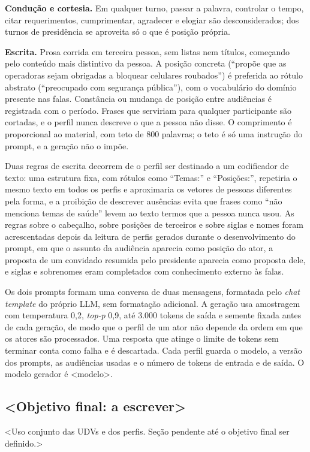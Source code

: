 \textbf{Condução e cortesia.} Em qualquer turno, passar a palavra, controlar o tempo, citar
requerimentos, cumprimentar, agradecer e elogiar são desconsiderados; dos turnos de presidência se
aproveita só o que é posição própria.

\textbf{Escrita.} Prosa corrida em terceira pessoa, sem listas nem títulos, começando pelo
conteúdo mais distintivo da pessoa. A posição concreta (``propõe que as operadoras sejam obrigadas a
bloquear celulares roubados'') é preferida ao rótulo abstrato (``preocupado com segurança
pública''), com o vocabulário do domínio presente nas falas. Constância ou mudança de posição entre
audiências é registrada com o período. Frases que serviriam para qualquer participante são cortadas,
e o perfil nunca descreve o que a pessoa não disse. O comprimento é proporcional ao material, com
teto de 800 palavras; o teto é só uma instrução do prompt, e a geração não o impõe.

Duas regras de escrita decorrem de o perfil ser destinado a um codificador de texto: uma estrutura
fixa, com rótulos como ``Temas:'' e ``Posições:'', repetiria o mesmo texto em todos os perfis e
aproximaria os vetores de pessoas diferentes pela forma, e a proibição de descrever ausências evita que
frases como ``não menciona temas de saúde'' levem ao texto termos que a pessoa nunca usou. As regras
sobre o cabeçalho, sobre posições de terceiros e sobre siglas e nomes foram acrescentadas depois da
leitura de perfis gerados durante o desenvolvimento do prompt, em que o assunto da audiência aparecia
como posição do ator, a proposta de um convidado resumida pelo presidente aparecia como proposta dele,
e siglas e sobrenomes eram completados com conhecimento externo às falas.

Os dois prompts formam uma conversa de duas mensagens, formatada pelo \textit{chat template} do próprio
LLM, sem formatação adicional. A geração usa amostragem com temperatura 0,2, \textit{top-p} 0,9, até
3.000 tokens de saída e semente fixada antes de cada geração, de modo que o perfil de um ator não
depende da ordem em que os atores são processados. Uma resposta que atinge o limite de tokens sem
terminar conta como falha e é descartada. Cada perfil guarda o modelo, a versão dos prompts, as
audiências usadas e o número de tokens de entrada e de saída. O modelo gerador é <modelo>.


\subsection{<Objetivo final: a escrever>}
\label{sec:metodo-objetivo}

<Uso conjunto das UDVs e dos perfis. Seção pendente até o objetivo final ser definido.>
